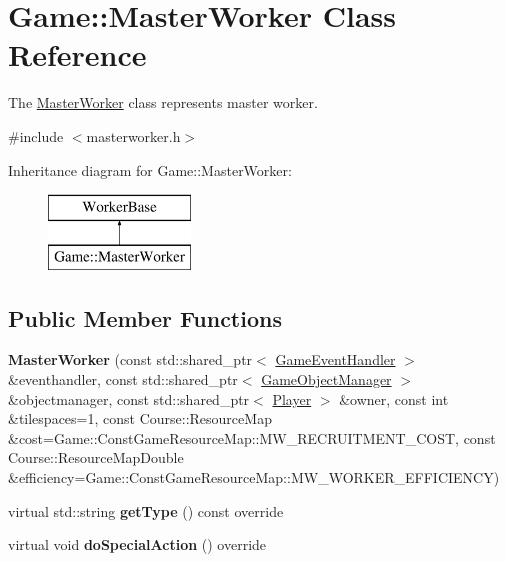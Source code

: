 \hypertarget{class_game_1_1_master_worker}{\section{Game\-:\-:Master\-Worker Class Reference}
\label{class_game_1_1_master_worker}
}


The \hyperlink{class_game_1_1_master_worker}{Master\-Worker} class represents master worker.  




{\ttfamily \#include $<$masterworker.\-h$>$}

Inheritance diagram for Game\-:\-:Master\-Worker\-:\begin{figure}[H]
\begin{center}
\leavevmode
\includegraphics[height=2.000000cm]{class_game_1_1_master_worker}
\end{center}
\end{figure}
\subsection*{Public Member Functions}
\begin{DoxyCompactItemize}
\item 
\hypertarget{class_game_1_1_master_worker_a2968d168a488dedd6f294540287650bd}{{\bfseries Master\-Worker} (const std\-::shared\-\_\-ptr$<$ \hyperlink{class_game_1_1_game_event_handler}{Game\-Event\-Handler} $>$ \&eventhandler, const std\-::shared\-\_\-ptr$<$ \hyperlink{class_game_1_1_game_object_manager}{Game\-Object\-Manager} $>$ \&objectmanager, const std\-::shared\-\_\-ptr$<$ \hyperlink{class_game_1_1_player}{Player} $>$ \&owner, const int \&tilespaces=1, const Course\-::\-Resource\-Map \&cost=Game\-::\-Const\-Game\-Resource\-Map\-::\-M\-W\-\_\-\-R\-E\-C\-R\-U\-I\-T\-M\-E\-N\-T\-\_\-\-C\-O\-S\-T, const Course\-::\-Resource\-Map\-Double \&efficiency=Game\-::\-Const\-Game\-Resource\-Map\-::\-M\-W\-\_\-\-W\-O\-R\-K\-E\-R\-\_\-\-E\-F\-F\-I\-C\-I\-E\-N\-C\-Y)}\label{class_game_1_1_master_worker_a2968d168a488dedd6f294540287650bd}

\item 
\hypertarget{class_game_1_1_master_worker_a2092d711ec017133ca4370b0056feebf}{virtual std\-::string {\bfseries get\-Type} () const override}\label{class_game_1_1_master_worker_a2092d711ec017133ca4370b0056feebf}

\item 
\hypertarget{class_game_1_1_master_worker_aab64502f53bbf8321252eb065bb61398}{virtual void {\bfseries do\-Special\-Action} () override}\label{class_game_1_1_master_worker_aab64502f53bbf8321252eb065bb61398}

\end{DoxyCompactItemize}


